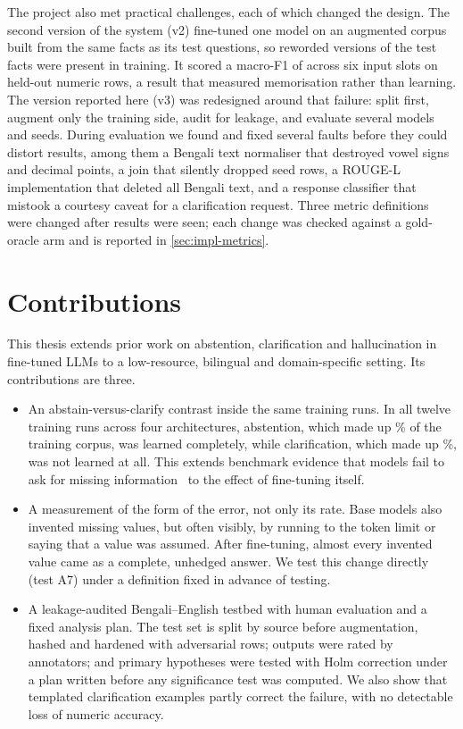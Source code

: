 The project also met practical challenges, each of which changed the design. The second version of the system (v2) fine-tuned one model on an augmented corpus built from the same facts as its test questions, so reworded versions of the test facts were present in training. It scored a macro-F1 of \VTwoMacroFone across six input slots on \VTwoEvalRows held-out numeric rows, a result that measured memorisation rather than learning. The version reported here (v3) was redesigned around that failure: split first, augment only the training side, audit for leakage, and evaluate several models and seeds. During evaluation we found and fixed several faults before they could distort results, among them a Bengali text normaliser that destroyed vowel signs and decimal points, a join that silently dropped seed rows, a ROUGE-L implementation that deleted all Bengali text, and a response classifier that mistook a courtesy caveat for a clarification request. Three metric definitions were changed after results were seen; each change was checked against a gold-oracle arm and is reported in \cref{sec:impl-metrics}.

\section{Contributions}
\label{sec:contributions}

This thesis extends prior work on abstention, clarification and hallucination in fine-tuned LLMs to a low-resource, bilingual and domain-specific setting. Its contributions are three.

\begin{itemize}
  \item An abstain-versus-clarify contrast inside the same training runs. In all twelve training runs across four architectures, abstention, which made up \TrainPctAbstain\% of the training corpus, was learned completely, while clarification, which made up \TrainPctClarify\%, was not learned at all. This extends benchmark evidence that models fail to ask for missing information~\cite{li2025questbench,kirichenko2025abstentionbench} to the effect of fine-tuning itself.
  \item A measurement of the form of the error, not only its rate. Base models also invented missing values, but often visibly, by running to the token limit or saying that a value was assumed. After fine-tuning, almost every invented value came as a complete, unhedged answer. We test this change directly (test A7) under a definition fixed in advance of testing.
  \item A leakage-audited Bengali--English testbed with human evaluation and a fixed analysis plan. The test set is split by source before augmentation, hashed and hardened with adversarial rows; \HumUniqueOutputs outputs were rated by \HumAnnotators annotators; and \SigPrimaryTotal primary hypotheses were tested with Holm correction under a plan written before any significance test was computed. We also show that \ClarifyTrainRows templated clarification examples partly correct the failure, with no detectable loss of numeric accuracy.
\end{itemize}

